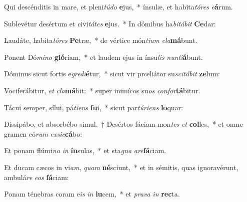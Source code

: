 \item Qui descénditis in mare, et pleni\textit{tú}\textit{do} \textbf{e}jus,~* ínsulæ, et habita\textit{tó}\textit{res} \textit{e}\textbf{á}rum.
\item Sublevétur desértum et civi\textit{tá}\textit{tes} \textbf{e}jus.~* In dómibus ha\textit{bi}\textit{tá}\textit{bit} \textbf{Ce}dar:
\item Laudáte, habita\textit{tó}\textit{res} \textbf{Pe}træ,~* de vértice món\textit{ti}\textit{um} \textit{cla}\textbf{má}bunt.
\item Ponent Dó\textit{mi}\textit{no} \textbf{gló}riam,~* et laudem ejus in ínsu\textit{lis} \textit{nun}\textit{ti}\textbf{á}bunt.
\item Dóminus sicut fortis e\textit{gre}\textit{di}\textbf{é}tur,~* sicut vir prœliátor su\textit{sci}\textit{tá}\textit{bit} \textbf{ze}lum:
\item Vociferábitur, \textit{et} \textit{cla}\textbf{má}bit:~* super inimícos su\textit{os} \textit{con}\textit{for}\textbf{tá}bitur.
\item Tácui semper, sílui, pá\textit{ti}\textit{ens} \textbf{fu}i,~* sicut par\textit{tú}\textit{ri}\textit{ens} \textbf{lo}quar:
\item Dissipábo, et absorbébo simul.~† Desértos fáciam mon\textit{tes} \textit{et} \textbf{col}les,~* et omne gramen eó\textit{rum} \textit{ex}\textit{sic}\textbf{cá}bo:
\item Et ponam flúmi\textit{na} \textit{in} \textbf{ín}sulas,~* et sta\textit{gna} \textit{a}\textit{re}\textbf{fá}ciam.
\item Et ducam cæcos in vi\textit{am}, \textit{quam} \textbf{né}sciunt,~* et in sémitis, quas ignoravérunt, ambulá\textit{re} \textit{e}\textit{os} \textbf{fá}ciam:
\item Ponam ténebras coram e\textit{is} \textit{in} \textbf{lu}cem,~* et \textit{pra}\textit{va} \textit{in} \textbf{rec}ta.
